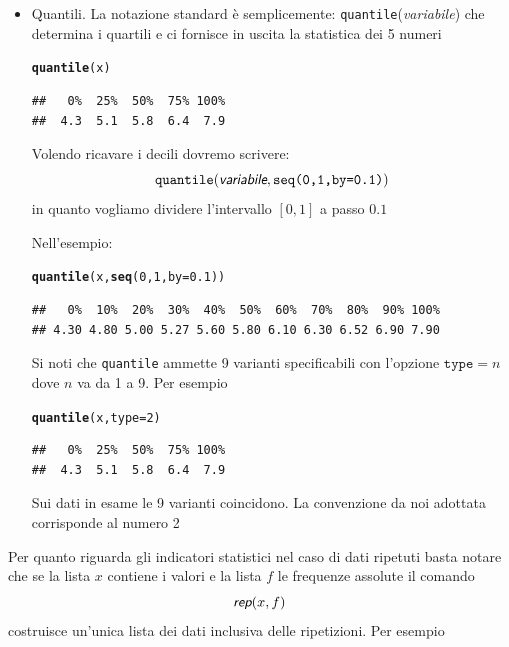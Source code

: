 \documentclass[onecolumn,12pt]{book}\usepackage[]{graphicx}\usepackage[]{color}
\makeatletter
\newcommand{\hlnum}[1]{\textcolor[rgb]{0.686,0.059,0.569}{#1}}%
\newcommand{\hlstd}[1]{\textcolor[rgb]{0.345,0.345,0.345}{#1}}%
\newcommand{\hlkwc}[1]{\textcolor[rgb]{0.333,0.667,0.333}{#1}}%
\newcommand{\hlkwd}[1]{\textcolor[rgb]{0.737,0.353,0.396}{\textbf{#1}}}%
\newenvironment{kframe}{%
 \def\at@end@of@kframe{}%
 \ifinner\ifhmode%
  \def\at@end@of@kframe{\end{minipage}}%
  \begin{minipage}{\columnwidth}%
 \fi\fi%
 \def\FrameCommand##1{\hskip\@totalleftmargin \hskip-\fboxsep
 \colorbox{shadecolor}{##1}\hskip-\fboxsep
     \hskip-\linewidth \hskip-\@totalleftmargin \hskip\columnwidth}%
 \MakeFramed {\advance\hsize-\width
   \@totalleftmargin\z@ \linewidth\hsize
   \@setminipage}}%
 {\par\unskip\endMakeFramed%
 \at@end@of@kframe}
\newenvironment{knitrout}{}{} %
\newcommand{\varia}[1]{\textsl{\textsf{#1}}}
\makeatother
\begin{document}
\begin{itemize}
\item{}Quantili. La notazione standard \`e semplicemente: \texttt{quantile}(\varia{variabile}) che determina i quartili e ci fornisce in uscita la statistica dei 5 numeri

\begin{knitrout}
\color{fgcolor}\begin{kframe}
\begin{alltt}
\hlkwd{quantile}\hlstd{(x)}
\end{alltt}
\begin{verbatim}
##   0%  25%  50%  75% 100% 
##  4.3  5.1  5.8  6.4  7.9
\end{verbatim}
\end{kframe}
\end{knitrout}
Volendo ricavare i decili dovremo scrivere:
$$\texttt{quantile}(\varia{variabile},\texttt{seq(0,1,by=0.1)})$$
in quanto vogliamo dividere l'intervallo $[0,1]$ a passo $0.1$

Nell'esempio:
\begin{knitrout}
\color{fgcolor}\begin{kframe}
\begin{alltt}
\hlkwd{quantile}\hlstd{(x,}\hlkwd{seq}\hlstd{(}\hlnum{0}\hlstd{,}\hlnum{1}\hlstd{,}\hlkwc{by}\hlstd{=}\hlnum{0.1}\hlstd{))}
\end{alltt}
\begin{verbatim}
##   0%  10%  20%  30%  40%  50%  60%  70%  80%  90% 100% 
## 4.30 4.80 5.00 5.27 5.60 5.80 6.10 6.30 6.52 6.90 7.90
\end{verbatim}
\end{kframe}
\end{knitrout}
Si noti che \texttt{quantile} ammette 9 varianti specificabili con l'opzione $\texttt{type}=n$ dove $n$ va da 1 a 9.
Per esempio
\begin{knitrout}
\color{fgcolor}\begin{kframe}
\begin{alltt}
\hlkwd{quantile}\hlstd{(x,}\hlkwc{type}\hlstd{=}\hlnum{2}\hlstd{)}
\end{alltt}
\begin{verbatim}
##   0%  25%  50%  75% 100% 
##  4.3  5.1  5.8  6.4  7.9
\end{verbatim}
\end{kframe}
\end{knitrout}
Sui dati in esame le 9 varianti coincidono. La convenzione da noi adottata corrisponde al numero 2
\end{itemize}
Per quanto riguarda gli indicatori statistici nel caso di dati ripetuti basta notare che se la lista $x$ contiene i valori e la lista $f$ le frequenze assolute il comando
$$\varia{rep}(x,f)$$ costruisce un'unica lista dei dati inclusiva delle ripetizioni.
Per esempio
\end{document}
